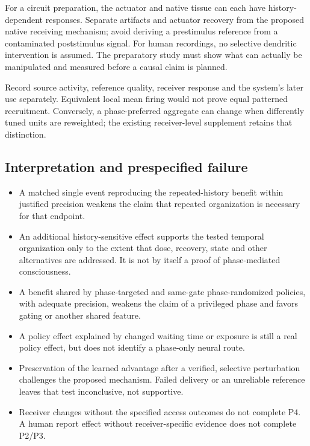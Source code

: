 \documentclass[
  american,
  11pt,
  letterpaper,
]{article}
\providecommand{\tightlist}{%
  \setlength{\itemsep}{0pt}\setlength{\parskip}{0pt}}
\begin{document}
For a circuit preparation, the actuator and native tissue can each have history-dependent responses. Separate artifacts and actuator recovery from the proposed native receiving mechanism; avoid deriving a prestimulus reference from a contaminated poststimulus signal. For human recordings, no selective dendritic intervention is assumed. The preparatory study must show what can actually be manipulated and measured before a causal claim is planned.

Record source activity, reference quality, receiver response and the system's later use separately. Equivalent local mean firing would not prove equal patterned recruitment. Conversely, a phase-preferred aggregate can change when differently tuned units are reweighted; the existing receiver-level supplement retains that distinction.

\subsection{Interpretation and prespecified failure}\label{interpretation-and-prespecified-failure}

\begin{itemize}
\tightlist
\item
  A matched single event reproducing the repeated-history benefit within justified precision weakens the claim that repeated organization is necessary for that endpoint.
\item
  An additional history-sensitive effect supports the tested temporal organization only to the extent that dose, recovery, state and other alternatives are addressed. It is not by itself a proof of phase-mediated consciousness.
\item
  A benefit shared by phase-targeted and same-gate phase-randomized policies, with adequate precision, weakens the claim of a privileged phase and favors gating or another shared feature.
\item
  A policy effect explained by changed waiting time or exposure is still a real policy effect, but does not identify a phase-only neural route.
\item
  Preservation of the learned advantage after a verified, selective perturbation challenges the proposed mechanism. Failed delivery or an unreliable reference leaves that test inconclusive, not supportive.
\item
  Receiver changes without the specified access outcomes do not complete P4. A human report effect without receiver-specific evidence does not complete P2/P3.
\end{itemize}
\end{document}
